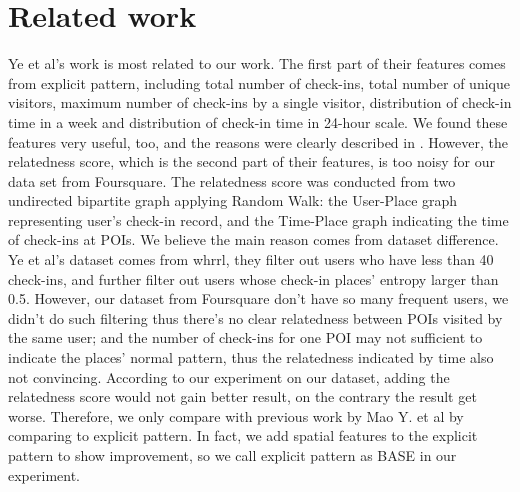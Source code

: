 \section{Related work}
\label{RelatedWork}
Ye et al's work is most related to our work. The first part of their features comes from explicit pattern, including total number of check-ins, total number of unique visitors, maximum number of check-ins by a single visitor, distribution of check-in time in a week and distribution of check-in time in 24-hour scale. We found these features very useful, too, and the reasons were clearly described in \cite{yemao}. However, the relatedness score, which is the second part of their features, is too noisy for our data set from Foursquare. The relatedness score was conducted from two undirected bipartite graph applying Random Walk: the User-Place graph representing user's check-in record, and the Time-Place graph indicating the time of check-ins at POIs. We believe the main reason comes from dataset difference. Ye et al's dataset comes from whrrl, they filter out users who have less than 40 check-ins, and further filter out users whose check-in places' entropy larger than 0.5. However, our dataset from Foursquare don't have so many frequent users, we didn't do such filtering thus there's no clear relatedness between POIs visited by the same user; and the number of check-ins for one POI may not sufficient to indicate the places' normal pattern, thus the relatedness indicated by time also not convincing. According to our experiment on our dataset, adding the relatedness score would not gain better result, on the contrary the result get worse. Therefore, we only compare with previous work by Mao Y. et al by comparing to explicit pattern. In fact, we add spatial features to the explicit pattern to show improvement, so we call explicit pattern as BASE in our experiment.

